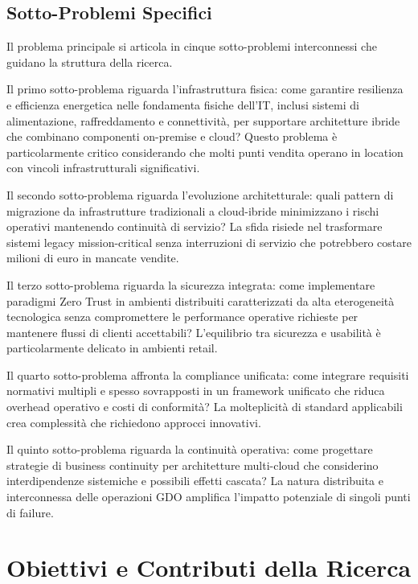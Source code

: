 \subsection{\texorpdfstring{\textbf{Sotto-Problemi
Specifici}}{Sotto-Problemi Specifici}}\label{sotto-problemi-specifici}

Il problema principale si articola in cinque sotto-problemi
interconnessi che guidano la struttura della ricerca.

Il primo sotto-problema riguarda l'infrastruttura fisica: come garantire
resilienza e efficienza energetica nelle fondamenta fisiche dell'IT,
inclusi sistemi di alimentazione, raffreddamento e connettività, per
supportare architetture ibride che combinano componenti on-premise e
cloud? Questo problema è particolarmente critico considerando che molti
punti vendita operano in location con vincoli infrastrutturali
significativi.

Il secondo sotto-problema riguarda l'evoluzione architetturale: quali
pattern di migrazione da infrastrutture tradizionali a cloud-ibride
minimizzano i rischi operativi mantenendo continuità di servizio? La
sfida risiede nel trasformare sistemi legacy mission-critical senza
interruzioni di servizio che potrebbero costare milioni di euro in
mancate vendite.

Il terzo sotto-problema riguarda la sicurezza integrata: come
implementare paradigmi Zero Trust in ambienti distribuiti caratterizzati
da alta eterogeneità tecnologica senza compromettere le performance
operative richieste per mantenere flussi di clienti accettabili?
L'equilibrio tra sicurezza e usabilità è particolarmente delicato in
ambienti retail.

Il quarto sotto-problema affronta la compliance unificata: come
integrare requisiti normativi multipli e spesso sovrapposti in un
framework unificato che riduca overhead operativo e costi di conformità?
La molteplicità di standard applicabili crea complessità che richiedono approcci innovativi.

Il quinto sotto-problema riguarda la continuità operativa: come
progettare strategie di business continuity per architetture multi-cloud
che considerino interdipendenze sistemiche e possibili effetti cascata?
La natura distribuita e interconnessa delle operazioni GDO amplifica
l'impatto potenziale di singoli punti di failure.

\section{\texorpdfstring{\textbf{Obiettivi e Contributi della
Ricerca}}{1.3 Obiettivi e Contributi della Ricerca}}\label{obiettivi-e-contributi-della-ricerca}

